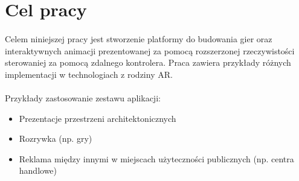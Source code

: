 \section{Cel pracy}
\paragraph{}
Celem niniejszej pracy jest stworzenie platformy do budowania gier oraz interaktywnych animacji prezentowanej za pomocą rozszerzonej rzeczywistości sterowaniej za pomocą zdalnego kontrolera. Praca zawiera przykłady różnych implementacji w technologiach z rodziny AR.

\paragraph{}
Przykłady zastosowanie zestawu aplikacji:

\begin{itemize}
	\item Prezentacje przestrzeni architektonicznych
	\item Rozrywka (np. gry)
	\item Reklama między innymi w miejscach użyteczności publicznych (np. centra handlowe)
\end{itemize}
